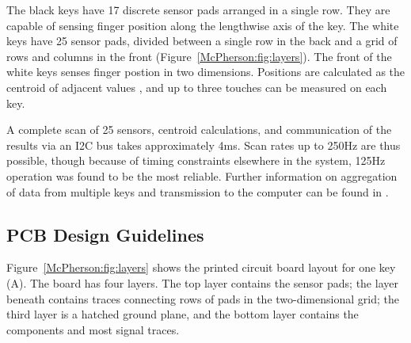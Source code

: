The black keys have 17 discrete sensor pads arranged in a single row. They are capable of sensing finger position along the lengthwise axis of the key. The white keys have 25 sensor pads, divided between a single row in the back and a grid of rows and columns in the front (Figure~\ref{McPherson:fig:layers}). The front of the white keys senses finger postion in two dimensions. Positions are calculated as the centroid of adjacent values \cite{McPherson:2011}, and up to three touches can be measured on each key.

A complete scan of 25 sensors, centroid calculations, and communication of the results via an I2C bus takes approximately 4ms. Scan rates up to 250Hz are thus possible, though because of timing constraints elsewhere in the system, 125Hz operation was found to be the most reliable. Further information on aggregation of data from multiple keys and transmission to the computer can be found in \cite{McPherson:2011}.


\subsection{PCB Design Guidelines}
Figure~\ref{McPherson:fig:layers} shows the printed circuit board layout for one key (A). The board has four layers. The top layer contains the sensor pads; the layer beneath contains traces connecting rows of pads in the two-dimensional grid; the third layer is a hatched ground plane, and the bottom layer contains the components and most signal traces. 

